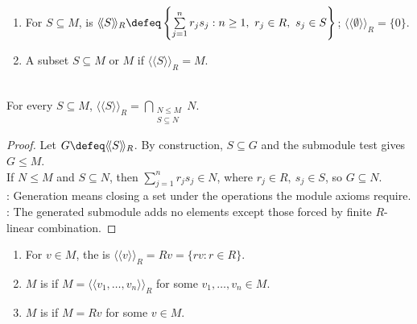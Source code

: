\begin{definition} \label{def:generated-submodule} 
\begin{enumerate}[label=(\roman*)]
\setlength{\itemsep}{0pt}
\item For $S\subseteq M$,  is $\langle\!\langle S\rangle\!\rangle_R \defeq \left\{\sum\limits_{j=1}^{n} r_js_j:n\geq1,\ r_j\in R,\ s_j\in S\right\}$; $\langle\!\langle\emptyset\rangle\!\rangle_R=\{0\}$.
\item A subset $S\subseteq M$  or  $M$ if $\langle\!\langle S\rangle\!\rangle_R=M$.
\end{enumerate}
\end{definition}

\begin{proposition} \label{prop:generated-submodule-smallest} \\
For every $S\subseteq M$, $\langle\!\langle S\rangle\!\rangle_R = \bigcap\limits_{\substack{N\leq M\\ S\subseteq N}}N$.
\begin{proof}
Let $G\defeq\langle\!\langle S\rangle\!\rangle_R$. By construction, $S\subseteq G$ and the submodule test gives $G\leq M$.\\
If $N\leq M$ and $S\subseteq N$, then $\sum\limits_{j=1}^{n}r_js_j\in N$, where $r_j\in R,\ s_j\in S$, so $G\subseteq N$.\\
: Generation means closing a set under the operations the module axioms require.\\
: The generated submodule adds no elements except those forced by finite $R$-linear combination.
\end{proof}
\end{proposition}

\begin{definition} \label{def:cyclic-and-finitely-generated-modules} 
\begin{enumerate}[label=(\roman*)]
\setlength{\itemsep}{0pt}
\item For $v\in M$, the  is $\langle\!\langle v\rangle\!\rangle_R=Rv=\{rv:r\in R\}$.
\item $M$ is  if $M=\langle\!\langle v_1,\ldots,v_n\rangle\!\rangle_R$ for some $v_1,\ldots,v_n\in M$.
\item $M$ is  if $M=Rv$ for some $v\in M$.
\end{enumerate}
\end{definition}


